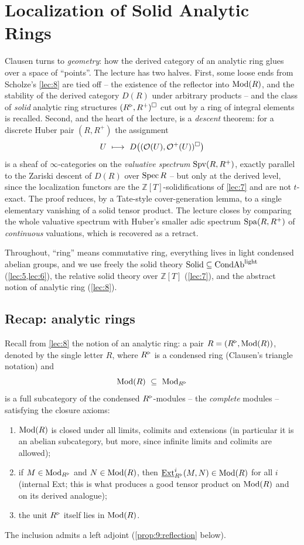\section{Localization of Solid Analytic Rings}
\label{lec:9}

Clausen turns to \emph{geometry}: how the derived category of an analytic ring
glues over a space of ``points''. The lecture has two halves. First, some
loose ends from Scholze's \cref{lec:8} are tied off -- the existence of the
reflector into $\operatorname{Mod}(R)$, and the stability of the derived category $D(R)$
under arbitrary products -- and the class of \emph{solid} analytic ring
structures $(R^{\triangleright},R^{+})^{\square}$ cut out by a ring of integral elements is
recalled. Second, and the heart of the lecture, is a \emph{descent} theorem:
for a discrete Huber pair $(R,R^{+})$ the assignment
\[
U\ \longmapsto\ D\bigl((\mathcal O(U),\mathcal O^{+}(U))^{\solid}\bigr)
\]
is a sheaf of $\infty$-categories on the \emph{valuative spectrum}
$\operatorname{Spv}(R,R^{+})$, exactly parallel to the Zariski descent of $D(R)$ over
$\operatorname{Spec} R$ -- but only at the derived level, since the localization functors
are the $\mathbb{Z}[T]$-solidifications of \cref{lec:7} and are not $t$-exact.
The proof reduces, by a Tate-style cover-generation lemma, to a single
elementary vanishing of a solid tensor product. The lecture closes by
comparing the whole valuative spectrum with Huber's smaller adic spectrum
$\operatorname{Spa}(R,R^{+})$ of \emph{continuous} valuations, which is recovered as a
retract.

Throughout, ``ring'' means commutative ring, everything lives in light
condensed abelian groups, and we use freely the solid theory
$\mathrm{Solid}\subseteq\mathrm{CondAb}^{\mathrm{light}}$ (\cref{lec:5,lec:6}), the relative solid theory over
$\mathbb{Z}[T]$ (\cref{lec:7}), and the abstract notion of analytic ring
(\cref{lec:8}).

\subsection{Recap: analytic rings}

Recall from \cref{lec:8} the notion of an analytic ring: a pair $R=(R^{\triangleright},
\operatorname{Mod}(R))$, denoted by the single letter $R$, where $R^{\triangleright}$ is a condensed ring
(Clausen's triangle notation) and
\begin{equation*}
\Mod(R)\ \subseteq\ \Mod_{\ur R}
\end{equation*}
is a full subcategory of the condensed $R^{\triangleright}$-modules -- the \emph{complete}
modules -- satisfying the closure axioms:
\begin{enumerate}
\item $\operatorname{Mod}(R)$ is closed under all limits, colimits and extensions (in
particular it is an abelian subcategory, but more, since infinite limits and
colimits are allowed);
\item if $M\in\operatorname{Mod}_{R^{\triangleright}}$ and $N\in\operatorname{Mod}(R)$, then $\underline{\operatorname{Ext}}^{i}_{R^{\triangleright}}(M,N)\in
\operatorname{Mod}(R)$ for all $i$ (internal Ext; this is what produces a good tensor product
on $\operatorname{Mod}(R)$ and on its derived analogue);
\item the unit $R^{\triangleright}$ itself lies in $\operatorname{Mod}(R)$.
\end{enumerate}
The inclusion admits a left adjoint (\cref{prop:9:reflection} below).

